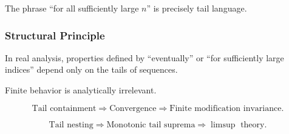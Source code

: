 \begin{remark}
The phrase ``for all sufficiently large $n$''
is precisely tail language.
\end{remark}

\subsubsection{Structural Principle}

\begin{remark}
In real analysis, properties defined by
``eventually'' or ``for sufficiently large indices''
depend only on the tails of sequences.

Finite behavior is analytically irrelevant.
\end{remark}

\begin{remark}
\[
\text{Tail containment}
\Rightarrow
\text{Convergence}
\Rightarrow
\text{Finite modification invariance}.
\]

\[
\text{Tail nesting}
\Rightarrow
\text{Monotonic tail suprema}
\Rightarrow
\limsup \text{ theory}.
\]
\end{remark}
